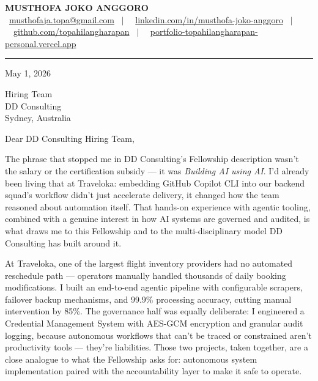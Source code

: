 \documentclass[11pt,a4paper]{article}
\begin{document}
\begin{center}
    {\LARGE \textbf{MUSTHOFA JOKO ANGGORO}} \\[4pt]
    \small
    \faEnvelope\ \href{mailto:musthofaja.topa@gmail.com}{musthofaja.topa@gmail.com}
    \ $|$ \
    \faLinkedin\ \href{https://www.linkedin.com/in/musthofa-joko-anggoro/}{linkedin.com/in/musthofa-joko-anggoro}
    \ $|$ \
    \faGithub\ \href{https://github.com/topahilangharapan}{github.com/topahilangharapan}
    \ $|$ \
    \faGlobe\ \href{https://portfolio-topahilangharapan-personal.vercel.app/}{portfolio-topahilangharapan-personal.vercel.app}
\end{center}

\vspace{4pt}
\hrule
\vspace{14pt}

May 1, 2026

\vspace{6pt}
Hiring Team \\
DD Consulting \\
Sydney, Australia

\vspace{6pt}
Dear DD Consulting Hiring Team,

The phrase that stopped me in DD Consulting's Fellowship description wasn't the salary
or the certification subsidy --- it was \textit{Building AI using AI}. I'd already been
living that at Traveloka: embedding GitHub Copilot CLI into our backend squad's workflow
didn't just accelerate delivery, it changed how the team reasoned about automation itself.
That hands-on experience with agentic tooling, combined with a genuine interest in how
AI systems are governed and audited, is what draws me to this Fellowship and to the
multi-disciplinary model DD Consulting has built around it.

At Traveloka, one of the largest flight inventory providers had no automated reschedule
path --- operators manually handled thousands of daily booking modifications. I built an
end-to-end agentic pipeline with configurable scrapers, failover backup mechanisms, and
99.9\% processing accuracy, cutting manual intervention by 85\%. The governance half was
equally deliberate: I engineered a Credential Management System with AES-GCM encryption
and granular audit logging, because autonomous workflows that can't be traced or
constrained aren't productivity tools --- they're liabilities. Those two projects, taken
together, are a close analogue to what the Fellowship asks for: autonomous system
implementation paired with the accountability layer to make it safe to operate.
\end{document}
